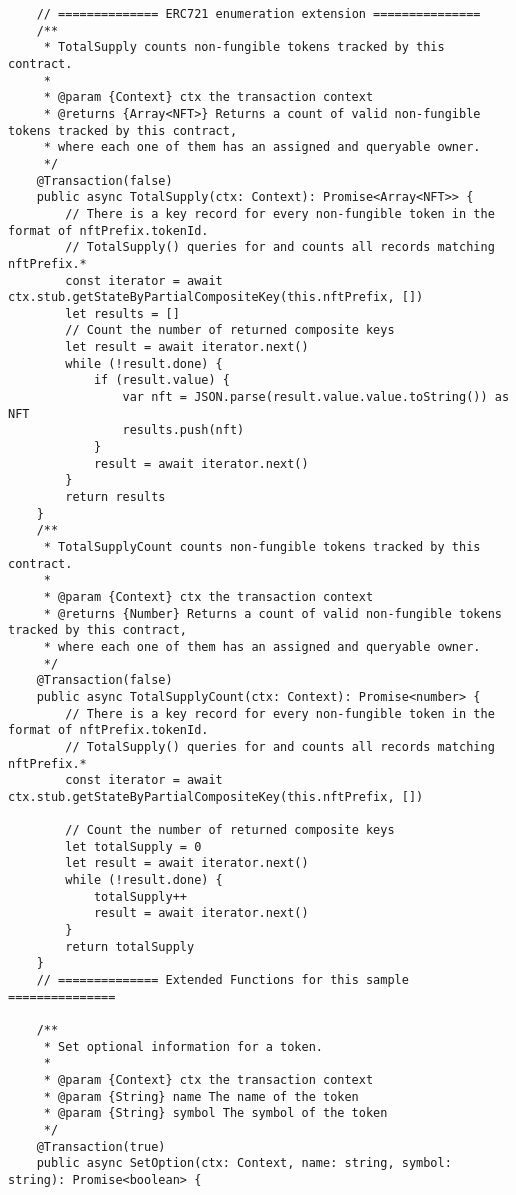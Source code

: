\begin{lstlisting}
    // ============== ERC721 enumeration extension ===============
    /**
     * TotalSupply counts non-fungible tokens tracked by this contract.
     *
     * @param {Context} ctx the transaction context
     * @returns {Array<NFT>} Returns a count of valid non-fungible tokens tracked by this contract,
     * where each one of them has an assigned and queryable owner.
     */
    @Transaction(false)
    public async TotalSupply(ctx: Context): Promise<Array<NFT>> {
        // There is a key record for every non-fungible token in the format of nftPrefix.tokenId.
        // TotalSupply() queries for and counts all records matching nftPrefix.*
        const iterator = await ctx.stub.getStateByPartialCompositeKey(this.nftPrefix, [])
        let results = []
        // Count the number of returned composite keys
        let result = await iterator.next()
        while (!result.done) {
            if (result.value) {
                var nft = JSON.parse(result.value.value.toString()) as NFT
                results.push(nft)
            }
            result = await iterator.next()
        }
        return results
    }
    /**
     * TotalSupplyCount counts non-fungible tokens tracked by this contract.
     *
     * @param {Context} ctx the transaction context
     * @returns {Number} Returns a count of valid non-fungible tokens tracked by this contract,
     * where each one of them has an assigned and queryable owner.
     */
    @Transaction(false)
    public async TotalSupplyCount(ctx: Context): Promise<number> {
        // There is a key record for every non-fungible token in the format of nftPrefix.tokenId.
        // TotalSupply() queries for and counts all records matching nftPrefix.*
        const iterator = await ctx.stub.getStateByPartialCompositeKey(this.nftPrefix, [])

        // Count the number of returned composite keys
        let totalSupply = 0
        let result = await iterator.next()
        while (!result.done) {
            totalSupply++
            result = await iterator.next()
        }
        return totalSupply
    }
    // ============== Extended Functions for this sample ===============

    /**
     * Set optional information for a token.
     *
     * @param {Context} ctx the transaction context
     * @param {String} name The name of the token
     * @param {String} symbol The symbol of the token
     */
    @Transaction(true)
    public async SetOption(ctx: Context, name: string, symbol: string): Promise<boolean> {


\end{lstlisting}

